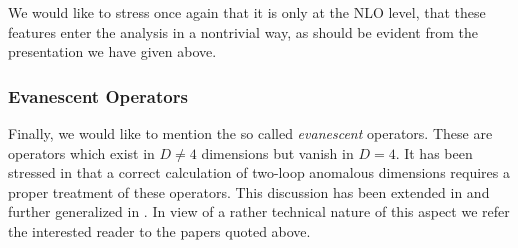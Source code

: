 We would like to stress once again that it is only at the NLO level,
that these features enter the analysis in a nontrivial way, as should
be evident from the presentation we have given above.

\subsubsection{Evanescent Operators}
               \label{sec:basicform:wc:evanop}
Finally, we would like to mention the so called {\it evanescent}
operators. These are operators which exist in $D\not=4$ dimensions but
vanish in $D=4$. It has been stressed in \cite{burasweisz:90} that a
correct calculation of two-loop anomalous dimensions requires a proper
treatment of these operators. This discussion has been extended in
\cite{dugan:91} and further generalized in \cite{herrlichnierste:94}.
In view of a rather technical nature of this aspect we refer the
interested reader to the papers quoted above.
